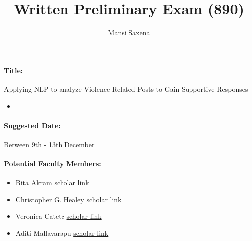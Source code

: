\documentclass{article}
\title{Written Preliminary Exam (890)}
\author{Mansi Saxena}
\date{}
\newcommand{\ms}[1]{\textcolor{red}{\textsf{}{MS:~~#1}}}
\newcommand{\vg}[1]{\textcolor{green!50!black}{\textsf{}{VG:~~#1}}}
\newcommand{\mps}[1]{\textcolor{red!50!black}{\textsf{}{MPS:~~#1}}}
\begin{document}
\maketitle


\paragraph{Title:} Applying NLP to analyze Violence-Related Posts to Gain Supportive Responses 
\begin{itemize}
    \item 
\end{itemize}

\paragraph{Suggested Date: } Between 9th - 13th December 
\paragraph{Potential Faculty Members:}


\begin{itemize}
    \item Bita Akram \href{https://scholar.google.com/citations?hl=en&user=ZEje0rwAAAAJ&view_op=list_works&sortby=pubdate}{scholar link}
    \item Christopher G. Healey \href{https://scholar.google.com/citations?user=dd1qLRcAAAAJ&hl=en&oi=ao}{scholar link}
    \item Veronica Catete \href{https://scholar.google.com/citations?user=TxIMXZoAAAAJ&hl=en}{scholar link}
    \item Aditi Mallavarapu \href{https://scholar.google.com/citations?user=o4XGBswAAAAJ&hl=en}{scholar link}
\end{itemize}
\end{document}
